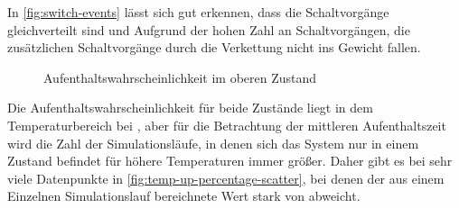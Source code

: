 \documentclass[main.tex]{subfiles}
\begin{document}

In \cref{fig:switch-events} lässt sich gut erkennen, dass die Schaltvorgänge gleichverteilt sind und Aufgrund der hohen Zahl an Schaltvorgängen, die zusätzlichen Schaltvorgänge durch die Verkettung nicht ins Gewicht fallen. 


\begin{figure}[H]
    \centering
    \caption{Aufenthaltswahrscheinlichkeit im oberen Zustand}\label{fig:temp-up-percentage}
\end{figure}

Die Aufenthaltswahrscheinlichkeit für beide Zustände liegt in dem Temperaturbereich bei , aber für die Betrachtung der mittleren Aufenthaltszeit wird die Zahl der Simulationsläufe, in denen sich das System nur in einem Zustand befindet für höhere Temperaturen immer größer. Daher gibt es bei  sehr viele Datenpunkte in \cref{fig:temp-up-percentage-scatter}, bei denen der aus einem Einzelnen Simulationslauf bereichnete Wert stark von  abweicht.
\end{document}
